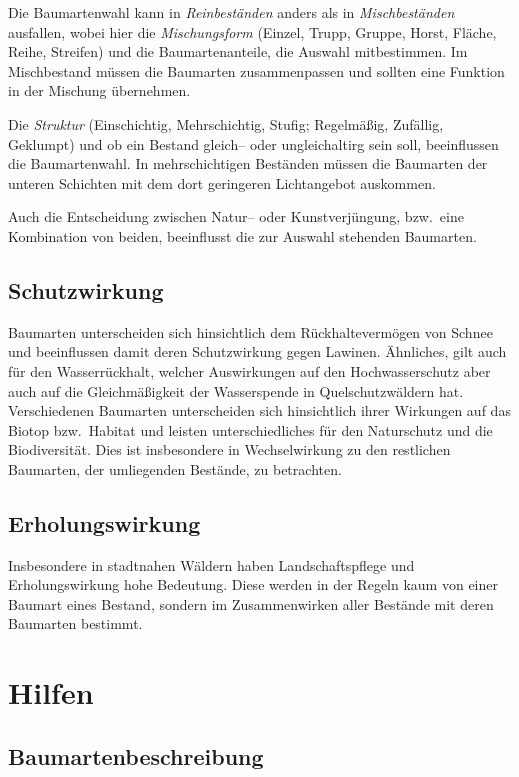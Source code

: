 \documentclass[twocolumn]{scrartcl}
\begin{document}
Die Baumartenwahl kann in \emph{Reinbeständen} anders als in
\emph{Mischbeständen} ausfallen, wobei hier die \emph{Mischungsform}
(Einzel, Trupp, Gruppe, Horst, Fläche, Reihe, Streifen) und die
Baumartenanteile, die Auswahl mitbestimmen. Im Mischbestand müssen die
Baumarten zusammenpassen und sollten eine Funktion in der Mischung
übernehmen.

Die \emph{Struktur} (Einschichtig, Mehrschichtig, Stufig; Regelmäßig,
Zufällig, Geklumpt) und ob ein Bestand gleich-- oder ungleichaltirg
sein soll, beeinflussen die Baumartenwahl. In mehrschichtigen
Beständen müssen die Baumarten der unteren Schichten mit dem dort
geringeren Lichtangebot auskommen.

Auch die Entscheidung zwischen Natur-- oder Kunstverjüngung, bzw.\
eine Kombination von beiden, beeinflusst die zur Auswahl stehenden
Baumarten.

\subsection{Schutzwirkung}
\label{ssec:schutz}

Baumarten unterscheiden sich hinsichtlich dem Rückhaltevermögen von
Schnee und beeinflussen damit deren Schutzwirkung gegen
Lawinen. Ähnliches, gilt auch für den Wasserrückhalt, welcher
Auswirkungen auf den Hochwasserschutz aber auch auf die
Gleichmäßigkeit der Wasserspende in Quelschutzwäldern
hat. Verschiedenen Baumarten unterscheiden sich hinsichtlich ihrer
Wirkungen auf das Biotop bzw.\ Habitat und leisten unterschiedliches
für den Naturschutz und die Biodiversität. Dies ist insbesondere in
Wechselwirkung zu den restlichen Baumarten, der umliegenden Bestände,
zu betrachten.

\subsection{Erholungswirkung}
\label{ssec:erholung}

Insbesondere in stadtnahen Wäldern haben Landschaftspflege und
Erholungswirkung hohe Bedeutung. Diese werden in der Regeln kaum von
einer Baumart eines Bestand, sondern im Zusammenwirken aller Bestände
mit deren Baumarten bestimmt.

\section{Hilfen}
\label{sec:hilfen}

\subsection{Baumartenbeschreibung}
\label{sec:baBeschreibung}
\end{document}
